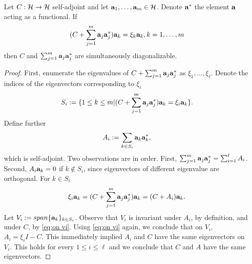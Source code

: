 \documentclass{amsart}
\numberwithin{equation}{section}
\begin{document}
\begin{lemma}\label{lemma:sim diag}
  Let $C:\mathcal{H} \to \mathcal{H}$ self-adjoint and let $\mathbf{a}_1,\dots,\mathbf{a}_m \in
  \mathcal{H}$. Denote $\mathbf{a}^*$ the element $\mathbf{a}$ acting as a
  functional. If
  \begin{equation*}
   (C + \sum_{j=1}^m \mathbf{a}_j\mathbf{a}_j^*) \mathbf{a}_k = \xi_k \mathbf{a}_k, k = 1,\dots,m
  \end{equation*}
  then $C$ and $\sum_{j=1}^m \mathbf{a}_j \mathbf{a}_j^*$ are simultaneously
  diagonalizable.
\end{lemma}
\begin{proof}
  First, enumerate the eigenvalues of $C + \sum_{j=1}^m
  \mathbf{a}_j\mathbf{a}_j^*$ as $\xi_1,\dots,\xi_\ell$. Denote the
  indices of the eigenvectors corresponding to $\xi_i$
  \begin{equation*}
    S_i := \{ 1 \leq k \leq m | (C + \sum_{j=1}^m \mathbf{a}_j\mathbf{a}_j^* )\mathbf{a}_k = \xi_i \mathbf{a}_k \}.
  \end{equation*}
  Define further
  \begin{equation*}
    A_i := \sum_{k \in S_i} \mathbf{a}_k \mathbf{a}_k^*,
  \end{equation*}
  which is self-adjoint. Two observations are in order. First,
  $\sum_{j=1}^m \mathbf{a}_j\mathbf{a}_j^* = \sum_{i=1}^\ell A_i$. Second, $A_i
  \mathbf{a}_k = 0$ if $k\not \in S_i$, since eigenvectors of different
  eigenvalue are orthogonal. For $k \in S_i$
  \begin{equation}\label{eq:on vi}
    \xi_i \mathbf{a}_k = (C + \sum_{j=1}^m \mathbf{a}_j \mathbf{a}_j^* ) \mathbf{a}_k = (C + A_i) \mathbf{a}_k.
  \end{equation}
  Let $V_i := span \{\mathbf{a}_k \}_{k\in S_i}$. Observe that $V_i$ is
  invariant under $A_i$, by definition, and under $C$, by \eqref{eq:on
    vi}. Using \eqref{eq:on vi} again, we conclude that on $V_i$, $A_i
  = \xi_iI - C$. This immediately implied $A_i$ and $C$ have the
  same eigenvectors on $V_i$. This holds for every $1 \leq i \leq
  \ell$ and we conclude that $C$ and $A$ have the same eigenvectors.
\end{proof}
\end{document}
